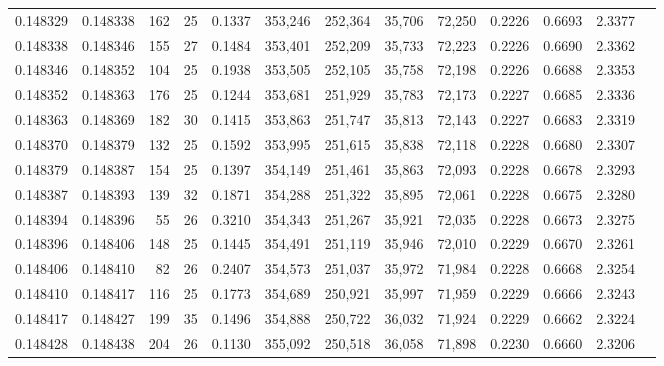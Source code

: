 \begin{tabular}{rrrrrrrrrrrrr}
0.148329 & 0.148338 & 162 &  25 &                                     0.1337 & 353,246 & 252,364 &  35,706 &  72,250 & 0.2226 & 0.6693 & 2.3377 \\
0.148338 & 0.148346 & 155 &  27 &                                     0.1484 & 353,401 & 252,209 &  35,733 &  72,223 & 0.2226 & 0.6690 & 2.3362 \\
0.148346 & 0.148352 & 104 &  25 &                                     0.1938 & 353,505 & 252,105 &  35,758 &  72,198 & 0.2226 & 0.6688 & 2.3353 \\
0.148352 & 0.148363 & 176 &  25 &                                     0.1244 & 353,681 & 251,929 &  35,783 &  72,173 & 0.2227 & 0.6685 & 2.3336 \\
0.148363 & 0.148369 & 182 &  30 &                                     0.1415 & 353,863 & 251,747 &  35,813 &  72,143 & 0.2227 & 0.6683 & 2.3319 \\
0.148370 & 0.148379 & 132 &  25 &                                     0.1592 & 353,995 & 251,615 &  35,838 &  72,118 & 0.2228 & 0.6680 & 2.3307 \\
0.148379 & 0.148387 & 154 &  25 &                                     0.1397 & 354,149 & 251,461 &  35,863 &  72,093 & 0.2228 & 0.6678 & 2.3293 \\
0.148387 & 0.148393 & 139 &  32 &                                     0.1871 & 354,288 & 251,322 &  35,895 &  72,061 & 0.2228 & 0.6675 & 2.3280 \\
0.148394 & 0.148396 &  55 &  26 &                                     0.3210 & 354,343 & 251,267 &  35,921 &  72,035 & 0.2228 & 0.6673 & 2.3275 \\
0.148396 & 0.148406 & 148 &  25 &                                     0.1445 & 354,491 & 251,119 &  35,946 &  72,010 & 0.2229 & 0.6670 & 2.3261 \\
0.148406 & 0.148410 &  82 &  26 &                                     0.2407 & 354,573 & 251,037 &  35,972 &  71,984 & 0.2228 & 0.6668 & 2.3254 \\
0.148410 & 0.148417 & 116 &  25 &                                     0.1773 & 354,689 & 250,921 &  35,997 &  71,959 & 0.2229 & 0.6666 & 2.3243 \\
0.148417 & 0.148427 & 199 &  35 &                                     0.1496 & 354,888 & 250,722 &  36,032 &  71,924 & 0.2229 & 0.6662 & 2.3224 \\
0.148428 & 0.148438 & 204 &  26 &                                     0.1130 & 355,092 & 250,518 &  36,058 &  71,898 & 0.2230 & 0.6660 & 2.3206 \\

\end{tabular}
